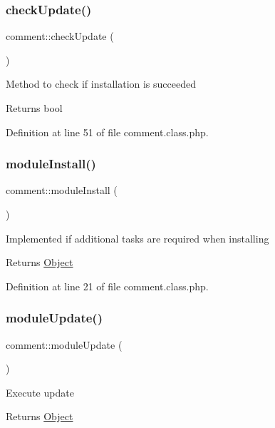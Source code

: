 \subsubsection{\texorpdfstring{check\+Update()}{checkUpdate()}}
{\footnotesize\ttfamily comment\+::check\+Update (\begin{DoxyParamCaption}{ }\end{DoxyParamCaption})}

Method to check if installation is succeeded \begin{DoxyReturn}{Returns}
bool 
\end{DoxyReturn}


Definition at line 51 of file comment.\+class.\+php.

\mbox{\label{classcomment_a635989397982dcf8a45c9a374bf11aec}} 
\subsubsection{\texorpdfstring{module\+Install()}{moduleInstall()}}
{\footnotesize\ttfamily comment\+::module\+Install (\begin{DoxyParamCaption}{ }\end{DoxyParamCaption})}

Implemented if additional tasks are required when installing \begin{DoxyReturn}{Returns}
\hyperlink{classObject}{Object} 
\end{DoxyReturn}


Definition at line 21 of file comment.\+class.\+php.

\mbox{\label{classcomment_abcf41a36b46e090d498f35a0df92edc0}} 
\subsubsection{\texorpdfstring{module\+Update()}{moduleUpdate()}}
{\footnotesize\ttfamily comment\+::module\+Update (\begin{DoxyParamCaption}{ }\end{DoxyParamCaption})}

Execute update \begin{DoxyReturn}{Returns}
\hyperlink{classObject}{Object} 
\end{DoxyReturn}


